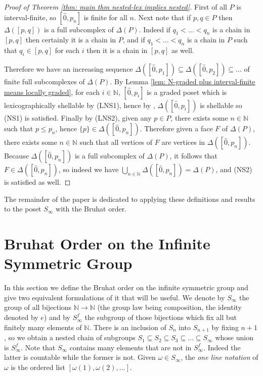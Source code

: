 \documentclass[oneside,11pt,reqno]{amsart}
\newcommand{\nn}{\ensuremath{\mathbb{N}}}
\theoremstyle{definition}
\newtheorem{proof techniques}{Proof Techniques}
\begin{document}
\begin{proof}[Proof of Theorem \ref{thm: main thm nested-lex implies nested}]
    First of all $P$ is interval-finite, so $[\hat{0} , p_n]$ is finite for all $n$. Next note that if $p , q \in P$ then $\Delta([p , q])$ is a full subcomplex of $\Delta(P)$. Indeed if $q_1 < \ldots < q_n$ is a chain in $[p , q]$ then certainly it is a chain in $P$, and if $q_1 < \ldots < q_n$ is a chain in $P$ such that $q_i \in [p , q]$ for each $i$ then it is a chain in $[p , q]$ as well.

    Therefore we have an increasing sequence $\Delta([\hat{0} , p_1]) \subseteq \Delta([\hat{0} , p_2]) \subseteq \ldots$ of finite full subcomplexes of $\Delta(P)$. By Lemma \ref{lem: N-graded plus interval-finite means locally graded}, for each $i \in \nn$, $[\hat{0} , p_i]$ is a graded poset which is lexicographically shellable by (LNS1), hence by \cite[Theorem 2.3]{bjorner1980shellable}, $\Delta([\hat{0} , p_i])$ is shellable so (NS1) is satisfied. Finally by (LNS2), given any $p \in P$, there exists some $n \in \nn$ such that $p \leq p_n$, hence $\{p\} \in \Delta([\hat{0} , p_n])$. Therefore given a face $F$ of $\Delta(P)$, there exists some $n \in \nn$ such that all vertices of $F$ are vertices in $\Delta([\hat{0} , p_n])$. Because $\Delta([\hat{0} , p_n])$ is a full subcomplex of $\Delta(P)$, it follows that $F \in \Delta([\hat{0} , p_n])$, so indeed we have $\bigcup_{n \in \nn} \Delta([\hat{0} , p_n]) = \Delta(P)$, and (NS2) is satisfied as well. 
\end{proof}

The remainder of the paper is dedicated to applying these definitions and results to the poset $S_\infty$ with the Bruhat order. 


\section{Bruhat Order on the Infinite Symmetric Group}\label{sec: Bruhat Order on the Infinite Symmetric Group}

In this section we define the Bruhat order on the infinite symmetric group and give two equivalent formulations of it that will be useful. We denote by $S_\infty$ the group of all bijections $\mathbb{N} \to \mathbb{N}$ (the group law being composition, the identity denoted by $e$) and by $S_\infty^f$ the subgroup of those bijections which fix all but finitely many elements of $\mathbb{N}$. There is an inclusion of $S_n$ into $S_{n + 1}$ by fixing $n + 1$, so we obtain a nested chain of subgroups $S_1 \subseteq S_2 \subseteq S_3 \subseteq \ldots \subseteq S_\infty$ whose union is $S_\infty^f$. Note that $S_\infty$ contains many elements that are not in $S_\infty^f$. Indeed the latter is countable while the former is not. Given $\omega \in S_\infty$, the \emph{one line notation} of $\omega$ is the ordered list $[\omega(1), \omega(2), \ldots]$. 
\end{document}
